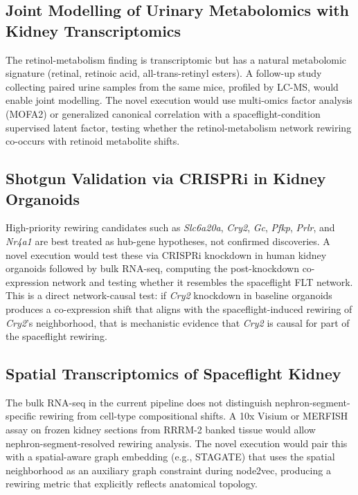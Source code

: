 \documentclass[11pt]{article}
\begin{document}
\subsection{Joint Modelling of Urinary Metabolomics with Kidney Transcriptomics}
The retinol-metabolism finding is transcriptomic but has a natural metabolomic signature (retinal, retinoic acid, all-trans-retinyl esters). A follow-up study collecting paired urine samples from the same mice, profiled by LC-MS, would enable joint modelling. The novel execution would use multi-omics factor analysis (MOFA2) or generalized canonical correlation with a spaceflight-condition supervised latent factor, testing whether the retinol-metabolism network rewiring co-occurs with retinoid metabolite shifts.

\subsection{Shotgun Validation via CRISPRi in Kidney Organoids}
High-priority rewiring candidates such as \emph{Slc6a20a}, \emph{Cry2}, \emph{Gc}, \emph{Pfkp}, \emph{Prlr}, and \emph{Nr4a1} are best treated as hub-gene hypotheses, not confirmed discoveries. A novel execution would test these via CRISPRi knockdown in human kidney organoids followed by bulk RNA-seq, computing the post-knockdown co-expression network and testing whether it resembles the spaceflight FLT network. This is a direct network-causal test: if \emph{Cry2} knockdown in baseline organoids produces a co-expression shift that aligns with the spaceflight-induced rewiring of \emph{Cry2}'s neighborhood, that is mechanistic evidence that \emph{Cry2} is causal for part of the spaceflight rewiring.

\subsection{Spatial Transcriptomics of Spaceflight Kidney}
The bulk RNA-seq in the current pipeline does not distinguish nephron-segment-specific rewiring from cell-type compositional shifts. A 10x Visium or MERFISH assay on frozen kidney sections from RRRM-2 banked tissue would allow nephron-segment-resolved rewiring analysis. The novel execution would pair this with a spatial-aware graph embedding (e.g., STAGATE) that uses the spatial neighborhood as an auxiliary graph constraint during node2vec, producing a rewiring metric that explicitly reflects anatomical topology.
\end{document}
